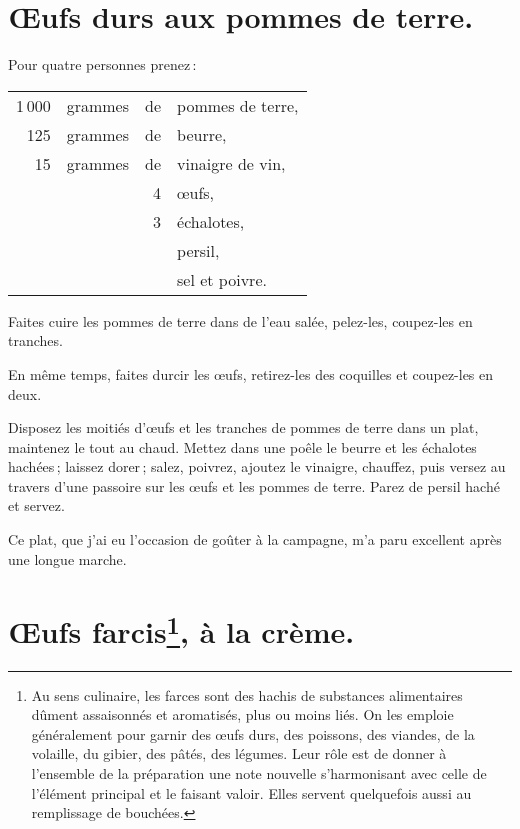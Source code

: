 \section*{\centering Œufs durs aux pommes de terre.}

Pour quatre personnes prenez :

\medskip

\footnotesize
\begin{longtable}{rrrp{16em}}
1 000 & grammes & de & pommes de terre,                                                                   \\
  125 & grammes & de & beurre,                                                                            \\
   15 & grammes & de & vinaigre de vin,                                                                   \\
      &         &  4 & œufs,                                                                              \\
      &         &  3 & échalotes,                                                                         \\
      &         &    & persil,                                                                            \\
      &         &    & sel et poivre.                                                                     \\
\end{longtable}
\normalsize

Faites cuire les pommes de terre dans de l'eau salée, pelez-les, coupez-les en
tranches.

En même temps, faites durcir les œufs, retirez-les des coquilles et coupez-les
en deux.

Disposez les moitiés d'œufs et les tranches de pommes de terre dans un plat,
maintenez le tout au chaud. Mettez dans une poêle le beurre et les échalotes
hachées ; laissez dorer ; salez, poivrez, ajoutez le vinaigre, chauffez, puis
versez au travers d'une passoire sur les œufs et les pommes de terre. Parez de
persil haché et servez.

Ce plat, que j'ai eu l'occasion de goûter à la campagne, m'a paru excellent
après une longue marche.

\section*{\centering Œufs farcis\footnote{
 Au sens culinaire, les farces sont des hachis de
substances alimentaires dûment assaisonnés et aromatisés, plus ou moins liés. On
les emploie généralement pour garnir des œufs durs, des poissons, des viandes,
de la volaille, du gibier, des pâtés, des légumes. Leur rôle est de donner
à l'ensemble de la préparation une note nouvelle s’harmonisant avec celle de
l'élément principal et le faisant valoir. Elles servent quelquefois aussi au
remplissage de bouchées.}, à la crème.}

